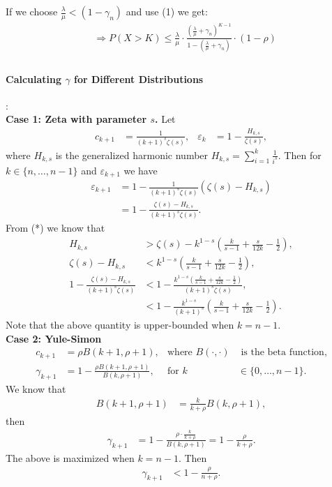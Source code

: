 \documentclass{article}
\begin{document}
If we choose \( \frac{\lambda}{\mu} < (1 - \gamma_{n}) \) and use (1) we get:
\begin{align*}
&\boxed{\Rightarrow P\left(X > K\right) \leq \frac{\lambda}{\mu}\cdot\frac{\left( \frac{\lambda}{\mu}+\gamma_{n}\right)^{K-1}}{1-\left(\frac{\lambda}{\mu} + \gamma_{n} \right)}\cdot \left(1-\rho\right)}\\
\end{align*}
\paragraph{Calculating $\gamma$ for Different Distributions}:\\

\textbf{Case 1: Zeta with parameter $s$.}
Let
\begin{align*}
c_{k+1} &= \frac{1}{(k+1)^{s} \zeta(s)}, & \varepsilon_k &= 1 - \frac{H_{k,s}}{\zeta(s)},
\end{align*}
where $H_{k,s}$ is the generalized harmonic number $H_{k,s} = \sum_{i=1}^{k} \frac{1}{i^{s}}$. Then for $k \in \{n, \ldots, n-1\}$ and $\varepsilon_{k+1}$ we have
\begin{align*}
\varepsilon_{k+1} &= 1 - \frac{1}{(k+1)^{s} \zeta(s)} \left( \zeta(s) - H_{k,s} \right) \\
&= 1 - \frac{\zeta(s) - H_{k,s}}{(k+1)^{s}\zeta(s)}.
\end{align*}
From (*) we know that
\begin{align*}
H_{k,s} &> \zeta(s) - k^{1-s} \left( \frac{k}{s-1} + \frac{s}{12k} - \frac{1}{2} \right), \\
\zeta(s) - H_{k,s} &< k^{1-s} \left( \frac{k}{s-1} + \frac{s}{12k} - \frac{1}{2} \right), \\
1 - \frac{\zeta(s) - H_{k,s}}{(k+1)^{s}\zeta(s)} &< 1 - \frac{k^{1-s} \left( \frac{k}{s-1} + \frac{s}{12k} - \frac{1}{2} \right)}{(k+1)^{s}\zeta(s)}, \\
&< 1 - \frac{k^{1-s}}{(k+1)^{s}} \left( \frac{k}{s-1} + \frac{s}{12k} - \frac{1}{2} \right).
\end{align*}
Note that the above quantity is upper-bounded when $k = n - 1$.\\

\textbf{Case 2: Yule-Simon}
\begin{align*}
c_{k+1} &= \rho B(k+1, \rho+1), & \text{where } B(\cdot,\cdot) & \text{ is the beta function}, \\
\gamma_{k+1} &= 1 - \frac{\rho B(k+1, \rho+1)}{B(k, \rho+1)}, & \text{for } k &\in \{0, \ldots, n-1\}.
\end{align*}
We know that
\begin{align*}
B(k+1, \rho+1) &= \frac{k}{k+\rho} B(k, \rho+1),
\end{align*}
then
\begin{align*}
\gamma_{k+1} &= 1 - \frac{\rho \cdot \frac{k}{k+\rho}}{B(k, \rho+1)} = 1 - \frac{\rho}{k+\rho}.
\end{align*}
The above is maximized when \( k = n-1 \). Then
\begin{align*}
\gamma_{k+1} &< 1 - \frac{\rho}{n+\rho}.
\end{align*}
\end{document}
